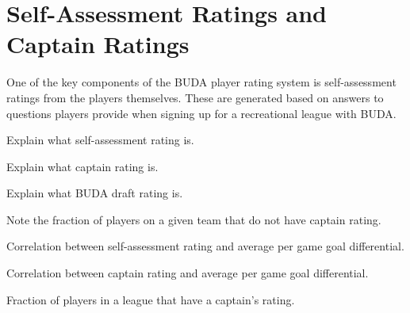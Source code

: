 \section{Self-Assessment Ratings and Captain Ratings}\label{sec:self_rating}

One of the key components of the BUDA player rating system is self-assessment ratings from the players themselves.  These are generated based on answers to questions players provide when signing up for a recreational league with BUDA.

Explain what self-assessment rating is.

Explain what captain rating is.

Explain what BUDA draft rating is.

Note the fraction of players on a given team that do not have captain rating.

Correlation between self-assessment rating and average per game goal differential.

Correlation between captain rating and average per game goal differential.

Fraction of players in a league that have a captain's rating.